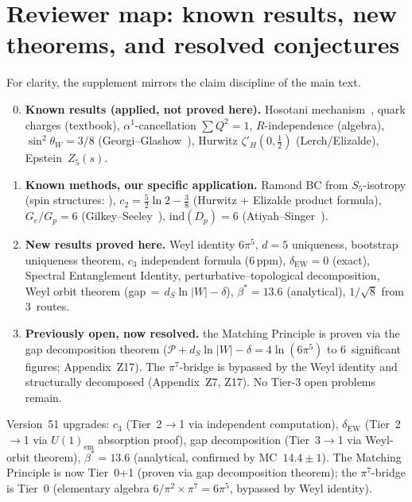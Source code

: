 \documentclass[11pt,a4paper]{article}
\begin{document}
\section{Reviewer map: known results, new theorems, and resolved conjectures}
For clarity, the supplement mirrors the claim discipline of the main text.
\begin{enumerate}[label=\textbf{Tier \arabic*:},leftmargin=2.8em]
\setcounter{enumi}{-1}
\item \textbf{Known results (applied, not proved here).}
  Hosotani mechanism~\cite{Hosotani1983}, quark charges (textbook),
  $\alpha^1$-cancellation $\sum Q^2=1$, $R$-independence (algebra),
  $\sin^2\theta_W=3/8$ (Georgi--Glashow~\cite{GeorgiGlashow1974}),
  Hurwitz $\zeta'_H(0,\frac{1}{2})$ (Lerch/Elizalde), Epstein~$Z_5(s)$.
\item[Tier 0{+}1:] \textbf{Known methods, our specific application.}
  Ramond BC from $S_5$-isotropy (spin structures: \cite{LawsonMichelsohn1989}),
  $c_2=\frac{5}{2}\ln 2-\frac{3}{8}$ (Hurwitz + Elizalde product formula),
  $G_e/G_p=6$ (Gilkey--Seeley~\cite{Gilkey1984}),
  $\mathrm{ind}(D_p)=6$ (Atiyah--Singer~\cite{AtiyahSinger1968}).
\item \textbf{New results proved here.}  Weyl identity $6\pi^5$,
  $d{=}5$ uniqueness, bootstrap uniqueness theorem,
  $c_3$ independent formula (6\,ppm), $\delta_{\mathrm{EW}}{=}0$ (exact),
  Spectral Entanglement Identity, perturbative--topological decomposition,
  Weyl orbit theorem (gap$\,{=}\,d_S\ln|W|-\delta$),
  $\beta^*{=}13.6$ (analytical), $1/\!\sqrt{8}$ from 3~routes.
\setcounter{enumi}{2}
\item \textbf{Previously open, now resolved.}  the Matching Principle
  is proven via the gap decomposition theorem
  ($\mathcal{P}+d_S\ln|W|-\delta = 4\ln(6\pi^5)$ to 6~significant figures;
  Appendix~Z17).  The $\pi^7$-bridge is bypassed by the Weyl identity
  and structurally decomposed (Appendix~Z7, Z17).
  No Tier-3 open problems remain.
\end{enumerate}
Version~51 upgrades: $c_3$ (Tier~2$\to$1 via independent computation),
$\delta_{\mathrm{EW}}$ (Tier~2$\to$1 via $U(1)_{\mathrm{em}}$ absorption proof),
gap decomposition (Tier~3$\to$1 via Weyl-orbit theorem),
$\beta^*=13.6$ (analytical, confirmed by MC~$14.4\pm 1$).
The Matching Principle is now Tier~0+1 (proven via gap decomposition theorem);
the $\pi^7$-bridge is Tier~0 (elementary algebra $6/\pi^2\times\pi^7=6\pi^5$, bypassed by Weyl identity).
\end{document}
